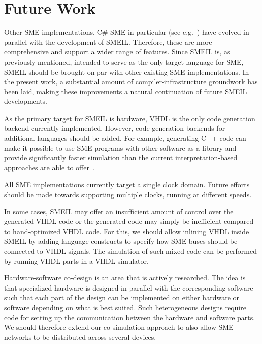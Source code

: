 \section{Future Work}
Other SME implementations, C\# SME in particular (see
e.g.~\cite{skovhede2018statemachine}) have evolved in parallel with the
development of SMEIL. Therefore, these are more comprehensive and support a
wider range of features. Since SMEIL is, as previously mentioned, intended to
serve as the only target language for SME, SMEIL should be brought on-par with
other existing SME implementations. In the present work, a substantial amount of
compiler-infrastructure groundwork has been laid, making these improvements a
natural continuation of future SMEIL developments.

As the primary target for SMEIL is hardware, VHDL is the only code generation
backend currently implemented. However, code-generation backends for additional
languages should be added. For example, generating C++ code can make it possible
to use SME programs with other software as a library and provide significantly
faster simulation than the current interpretation-based approaches are able to
offer~\cite{skovhede2017c++}.

All SME implementations currently target a single clock domain. Future efforts
should be made towards supporting multiple clocks, running at different speeds.

In some cases, SMEIL may offer an insufficient amount of control over the
generated VHDL code or the generated code may simply be inefficient compared to
hand-optimized VHDL code. For this, we should allow inlining VHDL inside SMEIL
by adding language constructs to specify how SME buses should be connected to
VHDL signals. The simulation of such mixed code can be performed by running VHDL
parts in a VHDL simulator.

Hardware-software co-design is an area that is actively researched. The idea is
that specialized hardware is designed in parallel with the corresponding
software such that each part of the design can be implemented on either hardware
or software depending on what is best suited. Such heterogeneous designs require
code for setting up the communication between the hardware and software
parts. We should therefore extend our co-simulation approach to also allow SME
networks to be distributed across several devices.


